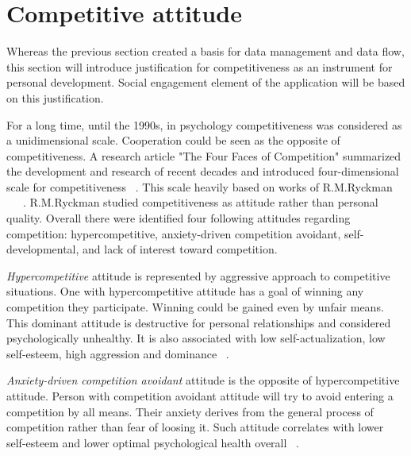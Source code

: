 
\section{Competitive attitude}\label{sec:competitive-attitude}



Whereas the previous section created a basis for data management and data flow,
this section will introduce justification for competitiveness as an instrument for personal development.
Social engagement element of the application will be based on this justification.

For a long time, until the 1990s, in psychology competitiveness was considered as a unidimensional scale.
Cooperation could be seen as the opposite of competitiveness.
A research article "The Four Faces of Competition" summarized the development and research of recent decades
and introduced four-dimensional scale for competitiveness ~\cite{the-four-faces-of-competetition}.
This scale heavily based on works of R.M.Ryckman ~\cite{ryckman-hca}~\cite{ryckman-adca}~\cite{ryckman-pdca}.
R.M.Ryckman studied competitiveness as attitude rather than personal quality.
Overall there were identified four following attitudes regarding competition:
hypercompetitive, anxiety-driven competition avoidant, self-developmental, and lack of interest toward competition.

\textit{Hypercompetitive} attitude is represented by aggressive approach to competitive situations.
One with hypercompetitive attitude has a goal of winning any competition they participate.
Winning could be gained even by unfair means.
This dominant attitude is destructive for personal relationships and considered psychologically unhealthy.
It is also associated with low self-actualization, low self-esteem, high aggression and dominance ~\cite{ryckman-hca}.

\textit{Anxiety-driven competition avoidant} attitude is the opposite of hypercompetitive attitude.
Person with competition avoidant attitude will try to avoid entering a competition by all means.
Their anxiety derives from the general process of competition rather than fear of loosing it.
Such attitude correlates with lower self-esteem and lower optimal psychological health overall ~\cite{ryckman-adca}.

